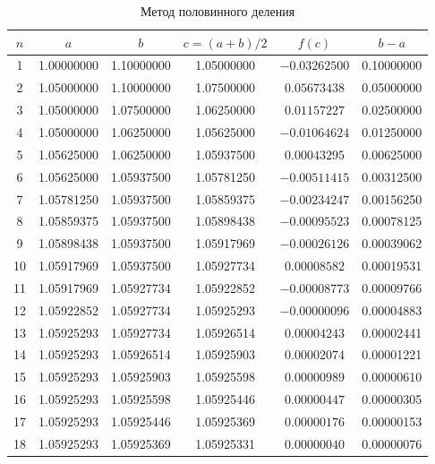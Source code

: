 \documentclass[14pt,a4paper]{extarticle}
\begin{document}
\begin{table}[H]
    \centering
    \caption{Метод половинного деления}
    \label{tab:bisection}
    \small
    \begin{tabular}{cccccc}
        \toprule
        $n$ & $a$ & $b$ & $c=(a+b)/2$ & $f(c)$ & $b-a$\\
        \midrule
        1  & 1.00000000 & 1.10000000 & 1.05000000 & $-0.03262500$ & 0.10000000\\
        2  & 1.05000000 & 1.10000000 & 1.07500000 & $0.05673438$ & 0.05000000\\
        3  & 1.05000000 & 1.07500000 & 1.06250000 & $0.01157227$ & 0.02500000\\
        4  & 1.05000000 & 1.06250000 & 1.05625000 & $-0.01064624$ & 0.01250000\\
        5  & 1.05625000 & 1.06250000 & 1.05937500 & $0.00043295$ & 0.00625000\\
        6  & 1.05625000 & 1.05937500 & 1.05781250 & $-0.00511415$ & 0.00312500\\
        7  & 1.05781250 & 1.05937500 & 1.05859375 & $-0.00234247$ & 0.00156250\\
        8  & 1.05859375 & 1.05937500 & 1.05898438 & $-0.00095523$ & 0.00078125\\
        9  & 1.05898438 & 1.05937500 & 1.05917969 & $-0.00026126$ & 0.00039062\\
        10 & 1.05917969 & 1.05937500 & 1.05927734 & $0.00008582$ & 0.00019531\\
        11 & 1.05917969 & 1.05927734 & 1.05922852 & $-0.00008773$ & 0.00009766\\
        12 & 1.05922852 & 1.05927734 & 1.05925293 & $-0.00000096$ & 0.00004883\\
        13 & 1.05925293 & 1.05927734 & 1.05926514 & $0.00004243$ & 0.00002441\\
        14 & 1.05925293 & 1.05926514 & 1.05925903 & $0.00002074$ & 0.00001221\\
        15 & 1.05925293 & 1.05925903 & 1.05925598 & $0.00000989$ & 0.00000610\\
        16 & 1.05925293 & 1.05925598 & 1.05925446 & $0.00000447$ & 0.00000305\\
        17 & 1.05925293 & 1.05925446 & 1.05925369 & $0.00000176$ & 0.00000153\\
        18 & 1.05925293 & 1.05925369 & 1.05925331 & $0.00000040$ & 0.00000076\\
        \bottomrule
    \end{tabular}
\end{table}
\end{document}
